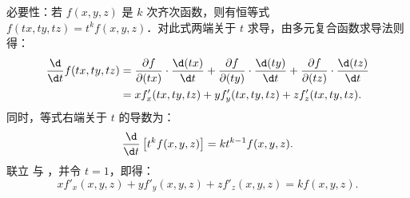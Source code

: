 \begin{myproof}
    必要性：若 $f(x, y, z)$ 是 $k$ 次齐次函数，则有恒等式 $f(tx, ty, tz) = t^k f(x, y, z)$．对此式两端关于 $t$ 求导，由多元复合函数求导法则得：
    \begin{equation}
        \begin{aligned}
            \frac{\d}{\d t} f(tx, ty, tz) & = \frac{\partial f}{\partial (tx)} \cdot \frac{\d (tx)}{\d t} + \frac{\partial f}{\partial (ty)} \cdot \frac{\d (ty)}{\d t} + \frac{\partial f}{\partial (tz)} \cdot \frac{\d (tz)}{\d t} \\
                                          & = x f'_x(tx, ty, tz) + y f'_y(tx, ty, tz) + z f'_z(tx, ty, tz).
        \end{aligned} \label{eq:Diff-LHS}
    \end{equation}
    同时，等式右端关于 $t$ 的导数为：
    \begin{equation}
        \frac{\d}{\d t} \left[ t^k f(x, y, z) \right] = k t^{k-1} f(x, y, z). \label{eq:Diff-RHS}
    \end{equation}
    联立  与 ，并令 $t = 1$，即得：
    \begin{equation}
        x f'_x(x, y, z) + y f'_y(x, y, z) + z f'_z(x, y, z) = k f(x, y, z).
    \end{equation}


\end{myproof}

